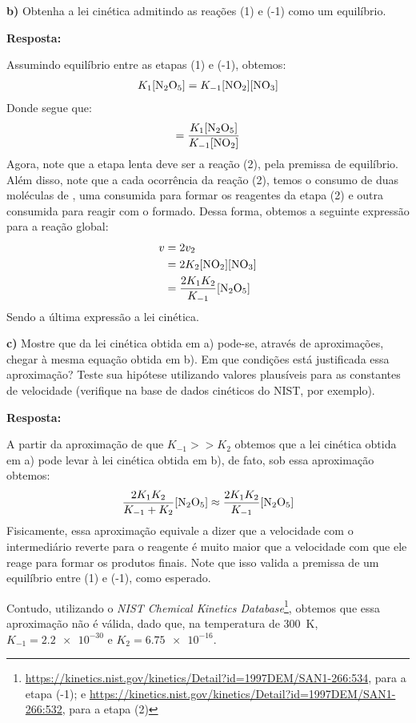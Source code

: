 \commentspace

\textbf{b)} Obtenha a lei cinética admitindo as reações (1) e (-1) como um equilíbrio.

\textbf{Resposta:}

Assumindo equilíbrio entre as etapas (1) e (-1), obtemos:
\begin{align*}
    K_1 [\ce{N2O5}] = K_{-1} [\ce{NO2}][\ce{NO3}]
\end{align*}
Donde segue que:
\begin{align*}
    [\ce{NO3}] = \frac{K_1 [\ce{N2O5}]}{K_{-1} [\ce{NO2}]} 
\end{align*}
Agora, note que a etapa lenta deve ser a reação (2), pela premissa de equilíbrio. Além disso, note que a cada ocorrência da reação (2), temos o consumo de duas moléculas de , uma consumida para formar os reagentes da etapa (2) e outra consumida para reagir com o  formado. Dessa forma, obtemos a seguinte expressão para a reação global:
\begin{align*}
    v &= 2 v_2\\
      &= 2 K_2 [\ce{NO2}][\ce{NO3}]\\
      &= \frac{2 K_1 K_2}{K_{-1}} [\ce{N2O5}]
\end{align*}
Sendo a última expressão a lei cinética.

\commentspace

\textbf{c)} Mostre que da lei cinética obtida em a) pode-se, através de aproximações, chegar à mesma equação obtida em b). Em que condições está justificada essa aproximação? Teste sua hipótese utilizando valores plausíveis para as constantes de velocidade (verifique na base de dados cinéticos do NIST, por exemplo).

\textbf{Resposta:}

A partir da aproximação de que \( K_{-1} >> K_2 \) obtemos que a lei cinética obtida em a) pode levar à lei cinética obtida em b), de fato, sob essa aproximação obtemos:
\begin{align*}
    \frac{2K_1K_2}{K_{-1} + K_2} [\ce{N2O5}] \approx \frac{2K_1K_2}{K_{-1}} [\ce{N2O5}] 
\end{align*}
Fisicamente, essa aproximação equivale a dizer que a velocidade com o intermediário  reverte para o reagente  é muito maior que a velocidade com que ele reage para formar os produtos finais. Note que isso valida a premissa de um equilíbrio entre (1) e (-1), como esperado.

Contudo, utilizando o \textit{NIST Chemical Kinetics Database}\footnote{\url{https://kinetics.nist.gov/kinetics/Detail?id=1997DEM/SAN1-266:534}, para a etapa (-1); e \url{https://kinetics.nist.gov/kinetics/Detail?id=1997DEM/SAN1-266:532}, para a etapa (2)}, obtemos que essa aproximação não é válida, dado que, na temperatura de \qty{300}{\kelvin}, \( K_{-1} = \num{2.2e-30} \) e \( K_2 = \num{6.75e-16} \). 

